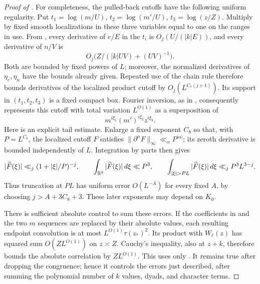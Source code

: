 \begin{proof}[Proof of ]
For completeness, the pulled-back cutoffs have the following uniform
regularity. Put
$t_1=\log(m/U)$, $t_2=\log(m'/U)$, $t_3=\log(z/Z)$.
Multiply by fixed smooth localizations in these three variables equal
to one on the ranges in use. From ,
every derivative of $e/E$ in the $t_i$ is
$O_j(U/(|k|E))$, and every derivative of $n/V$ is
\[
                 O_j\bigl(Z/(|k|UV)+(UV)^{-1}\bigr).
\]
Both are bounded by fixed powers of $L$; moreover, the normalized
derivatives of $\eta_e,\eta_n$ have the bounds already given.
Repeated use of the chain rule therefore bounds derivatives of the
localized product cutoff by $O_j(L^{C_7(j+1)})$. Its support in
$(t_1,t_2,t_3)$ is a fixed compact box. Fourier inversion, as in
, consequently represents this cutoff
with total variation $L^{O(1)}$ as a superposition of
\begin{equation}\label{eq:typeii-three-powers}
                        m^{i\xi_1}(m')^{i\xi_2}z^{i\xi_3}.
\end{equation}
Here is an explicit tail estimate. Enlarge a fixed exponent $C_8$ so
that, with $P=L^{C_8}$, the localized cutoff $F$ satisfies
$\|\partial^\alpha F\|_\infty\ll_\alpha P^{|\alpha|}$; its
zeroth derivative is bounded independently of $L$. Integration by parts
then gives
\[
 |\widehat F(\xi)|\ll_j(1+|\xi|/P)^{-j},\qquad
 \int_{\R^3}|\widehat F(\xi)|\,d\xi\ll P^3,\qquad
 \int_{|\xi|>PL}|\widehat F(\xi)|\,d\xi\ll_j P^3L^{3-j}.
\]
Thus truncation at $PL$ has uniform error $O(L^{-A})$ for every fixed
$A$, by choosing $j>A+3C_8+3$. These later exponents may depend on
$K_0$.

There is sufficient absolute control to sum these errors. If the
coefficients in  and the two
$m$ sequences are replaced by their absolute values, each resulting
endpoint convolution is at most $L^{O(1)}\tau(z_*)^2$. Its product
with $W_\ell(z)$ has squared sum $O(ZL^{O(1)})$ on $z\asymp Z$.
Cauchy's inequality, also at $z+k$, therefore bounds the absolute
correlation by $ZL^{O(1)}$. This uses only
. It remains true after dropping the
congruence; hence it controls the errors just described, after summing
the polynomial number of $k$ values, dyads, and character terms.


\end{proof}
